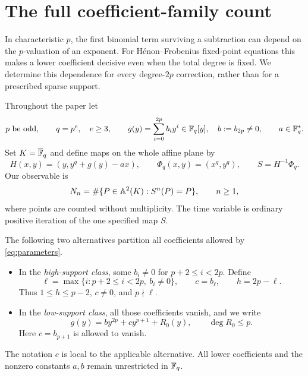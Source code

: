 \section{The full coefficient-family count}\label{sec:intro}

In characteristic $p$, the first binomial term surviving a subtraction
can depend on the $p$-valuation of an exponent. For H\'enon--Frobenius
fixed-point equations this makes a lower coefficient decisive even
when the total degree is fixed. We determine this dependence for every
degree-$2p$ correction, rather than for a prescribed sparse support.

Throughout the paper let
\begin{equation}\label{eq:parameters}
 p\text{ be odd},\qquad q=p^e,\quad e\ge3,\qquad
 g(y)=\sum_{i=0}^{2p}b_i y^i\in\mathbb F_q[y],\quad b:=b_{2p}\ne0,
 \qquad a\in\mathbb F_q^*.
\end{equation}
Set $K=\overline{\mathbb F}_q$ and define maps on the whole affine plane by
\begin{equation}\label{eq:maps}
 H(x,y)=(y,y^q+g(y)-ax),\qquad
 \Phi_q(x,y)=(x^q,y^q),\qquad S=H^{-1}\Phi_q.
\end{equation}
Our observable is
\[
 N_n=\#\{P\in\mathbb A^2(K):S^n(P)=P\},\qquad n\ge1,
\]
where points are counted without multiplicity. The time variable is
ordinary positive iteration of the one specified map $S$.

The following two alternatives partition all coefficients allowed
by \eqref{eq:parameters}.
\begin{itemize}
\item In the \emph{high-support class}, some $b_i\ne0$ for
  $p+2\le i<2p$. Define
  \[
  \ell=\max\{i:p+2\le i<2p,\ b_i\ne0\},\qquad
  c=b_\ell,\qquad h=2p-\ell.
  \]
  Thus $1\le h\le p-2$, $c\ne0$, and $p\nmid\ell$.
\item In the \emph{low-support class}, all those coefficients vanish,
  and we write
  \[
  g(y)=by^{2p}+cy^{p+1}+R_0(y),\qquad \deg R_0\le p.
  \]
  Here $c=b_{p+1}$ is allowed to vanish.
\end{itemize}
The notation $c$ is local to the applicable alternative. All lower
coefficients and the nonzero constants $a,b$ remain unrestricted in
$\mathbb F_q$.

